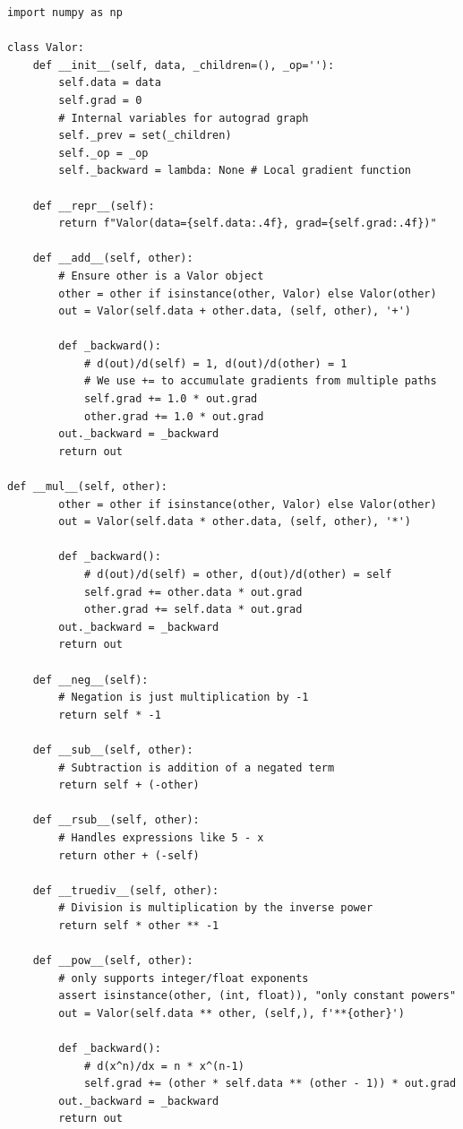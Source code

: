 \documentclass{tufte-handout}
\begin{document}
\begin{lstlisting}[caption={The \texttt{Valor} class in \texttt{mini\_nn/autograd.py}.}]
import numpy as np

class Valor:
    def __init__(self, data, _children=(), _op=''):
        self.data = data
        self.grad = 0
        # Internal variables for autograd graph
        self._prev = set(_children)
        self._op = _op
        self._backward = lambda: None # Local gradient function

    def __repr__(self):
        return f"Valor(data={self.data:.4f}, grad={self.grad:.4f})"

    def __add__(self, other):
        # Ensure other is a Valor object
        other = other if isinstance(other, Valor) else Valor(other)
        out = Valor(self.data + other.data, (self, other), '+')

        def _backward():
            # d(out)/d(self) = 1, d(out)/d(other) = 1
            # We use += to accumulate gradients from multiple paths
            self.grad += 1.0 * out.grad
            other.grad += 1.0 * out.grad
        out._backward = _backward
        return out

def __mul__(self, other):
        other = other if isinstance(other, Valor) else Valor(other)
        out = Valor(self.data * other.data, (self, other), '*')

        def _backward():
            # d(out)/d(self) = other, d(out)/d(other) = self
            self.grad += other.data * out.grad
            other.grad += self.data * out.grad
        out._backward = _backward
        return out

    def __neg__(self):
        # Negation is just multiplication by -1
        return self * -1

    def __sub__(self, other):
        # Subtraction is addition of a negated term
        return self + (-other)

    def __rsub__(self, other):
        # Handles expressions like 5 - x
        return other + (-self)

    def __truediv__(self, other):
        # Division is multiplication by the inverse power
        return self * other ** -1

    def __pow__(self, other):
        # only supports integer/float exponents
        assert isinstance(other, (int, float)), "only constant powers"
        out = Valor(self.data ** other, (self,), f'**{other}')

        def _backward():
            # d(x^n)/dx = n * x^(n-1)
            self.grad += (other * self.data ** (other - 1)) * out.grad
        out._backward = _backward
        return out


\end{lstlisting}
\end{document}
